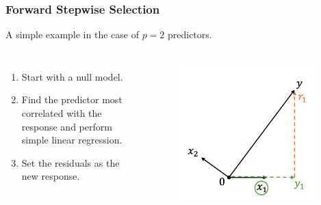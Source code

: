 \begin{frame}
\frametitle{Forward Stepwise Selection}
A simple example in the case of $p=2$ predictors.

\begin{columns}
    \begin{enumerate}
        \item Start with a null model.
        \item Find the predictor most correlated with the response and perform simple linear regression.
        \item Set the residuals as the new response.
    \end{enumerate}
    
    \begin{figure}[!htbp]
        \begin{center}
            \includegraphics[width=0.95\textwidth]{img/FStepR/3.jpeg}
        \end{center}
    \end{figure}
    \end{columns}
\end{frame}

